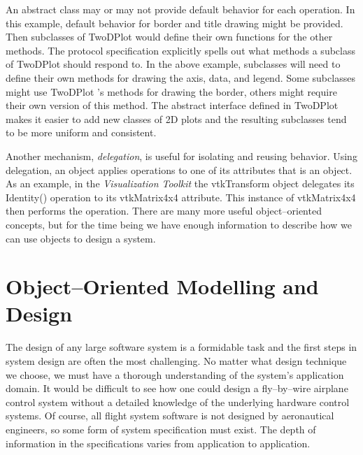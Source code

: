 An abstract class may or may not provide default behavior for each operation. In this example, default behavior for border and title drawing might be provided. Then subclasses of TwoDPlot would define their own functions for the other methods. The protocol specification explicitly spells out what methods a subclass of TwoDPlot should respond to. In the above example, subclasses will need to define their own methods for drawing the axis, data, and legend. Some subclasses might use TwoDPlot 's methods for drawing the border, others might require their own version of this method. The abstract interface defined in TwoDPlot makes it easier to add new classes of 2D plots and the resulting subclasses tend to be more uniform and consistent.

Another mechanism, \emph{delegation}, is useful for isolating and reusing behavior. Using delegation, an object applies operations to one of its attributes that is an object. As an example, in the \emph{Visualization Toolkit} the vtkTransform object delegates its Identity() operation to its vtkMatrix4x4 attribute. This instance of vtkMatrix4x4 then performs the operation. There are many more useful object--oriented concepts, but for the time being we have enough information to describe how we can use objects to design a system.

\section{Object--Oriented Modelling and Design}

The design of any large software system is a formidable task and the first steps in system design are often the most challenging. No matter what design technique we choose, we must have a thorough understanding of the system's application domain. It would be difficult to see how one could design a fly--by--wire airplane control system without a detailed knowledge of the underlying hardware control systems. Of course, all flight system software is not designed by aeronautical engineers, so some form of system specification must exist. The depth of information in the specifications varies from application to application.

